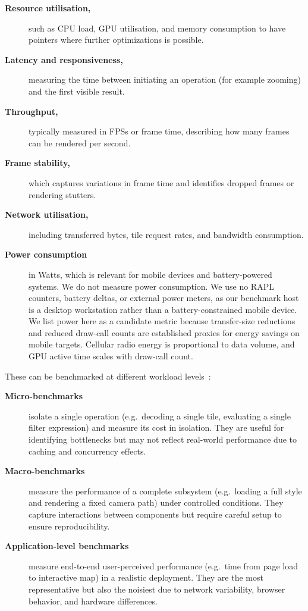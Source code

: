 \begin{description}
    \item[\textbf{Resource utilisation,}] such as \ac{CPU} load, \ac{GPU} utilisation, and memory consumption to have pointers where further optimizations is possible.
    \item[\textbf{Latency and responsiveness,}] measuring the time between initiating an operation (for example zooming) and the first visible result.
    \item[\textbf{Throughput,}] typically measured in \acp{FPS} or frame time, describing how many frames can be rendered per second.
    \item[\textbf{Frame stability,}] which captures variations in frame time and identifies dropped frames or rendering stutters.
    \item[\textbf{Network utilisation,}] including transferred bytes, tile request rates, and bandwidth consumption.
    \item[\textbf{Power consumption}] in Watts, which is relevant for mobile devices and battery-powered systems.  We do not measure power consumption.
We use no \ac{RAPL} counters, battery deltas, or external power meters, as our benchmark host is a desktop workstation rather than a battery-constrained mobile device.  We list power here as a candidate metric because transfer-size reductions and reduced draw-call counts are established proxies for energy savings on mobile targets.
Cellular radio energy is proportional to data volume, and \ac{GPU} active time scales with draw-call count.
\end{description}

These can be benchmarked at different workload levels~\cite{jainArtComputerSystems1991}:

\begin{description}
    \item[\textbf{Micro-benchmarks}] isolate a single operation (e.g.\ decoding a single tile, evaluating a single filter expression) and measure its cost in isolation.
They are useful for identifying bottlenecks but may not reflect real-world performance due to caching and concurrency effects.
    \item[\textbf{Macro-benchmarks}] measure the performance of a complete subsystem (e.g.\ loading a full style and rendering a fixed camera path) under controlled conditions.
They capture interactions between components but require careful setup to ensure reproducibility.
    \item[\textbf{Application-level benchmarks}] measure end-to-end user-perceived performance (e.g.\ time from page load to interactive map) in a realistic deployment.
They are the most representative but also the noisiest due to network variability, browser behavior, and hardware differences.
\end{description}

